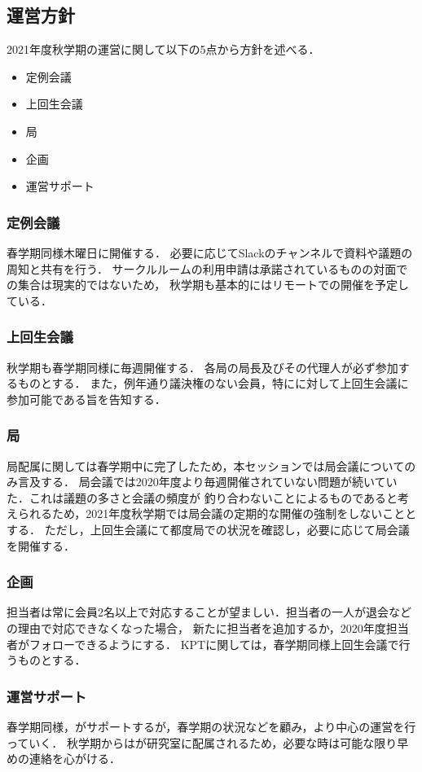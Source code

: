 \subsection*{運営方針}


2021年度秋学期の運営に関して以下の5点から方針を述べる．
\begin{itemize}
    \item 定例会議
    \item 上回生会議
    \item 局
    \item 企画
    \item 運営サポート
\end{itemize}

\subsubsection*{定例会議}
春学期同様木曜日に開催する．
必要に応じてSlackのチャンネルで資料や議題の周知と共有を行う．
サークルルームの利用申請は承諾されているものの対面での集合は現実的ではないため，
秋学期も基本的にはリモートでの開催を予定している．

\subsubsection*{上回生会議}
秋学期も春学期同様に毎週開催する．
各局の局長及びその代理人が必ず参加するものとする．
また，例年通り議決権のない会員，特に\firstGrade{}に対して上回生会議に
参加可能である旨を告知する．

\subsubsection*{局}
局配属に関しては春学期中に完了したため，本セッションでは局会議についてのみ言及する．
局会議では2020年度より毎週開催されていない問題が続いていた．これは議題の多さと会議の頻度が
釣り合わないことによるものであると考えられるため，2021年度秋学期では局会議の定期的な開催の強制をしないこととする．
ただし，上回生会議にて都度局での状況を確認し，必要に応じて局会議を開催する．

\subsubsection*{企画}
担当者は常に会員2名以上で対応することが望ましい．担当者の一人が退会などの理由で対応できなくなった場合，
新たに担当者を追加するか，2020年度担当者がフォローできるようにする．
KPTに関しては，春学期同様上回生会議で行うものとする．

\subsubsection*{運営サポート}
春学期同様，\thirdGrade{}がサポートするが，春学期の状況などを顧み，より\secondGrade{}中心の運営を行っていく．
秋学期からは\thirdGrade{}が研究室に配属されるため，必要な時は可能な限り早めの連絡を心がける．
